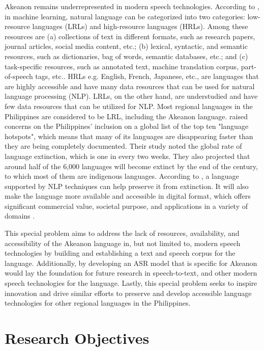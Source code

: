 Akeanon remains underrepresented in modern speech technologies. According to , in machine learning, natural language can be categorized into two categories: low-resource languages (LRLs) and high-resource languages (HRLs). Among these resources are (a) collections of text in different formats, such as research papers, journal articles, social media content, etc.; (b) lexical, syntactic, and semantic resources, such as dictionaries, bag of words, semantic databases, etc.; and (c) task-specific resources, such as annotated text, machine translation corpus, part-of-speech tags, etc.. HRLs e.g. English, French, Japanese, etc., are languages that are highly accessible and have many data resources that can be used for natural language processing (NLP). LRLs, on the other hand, are understudied and have few data resources that can be utilized for NLP.  Most regional languages in the Philippines are considered to be LRL, including the Akeanon language.  raised concerns on the Philippines' inclusion on a global list of the top ten "language hotspots", which means that many of its languages are disappearing faster than they are being completely documented. Their study noted the global rate of language extinction, which is one in every two weeks. They also projected that around half of the 6,000 languages will become extinct by the end of the century, to which most of them are indigenous languages. According to , a language supported by NLP techniques can help preserve it from extinction. It will also make the language more available and accessible in digital format, which offers significant commercial value, societal purpose, and applications in a variety of domains \cite{Tsvetkov:2017}.

This special problem aims to address the lack of resources, availability, and accessibility of the Akeanon language in, but not limited to, modern speech technologies by building and establishing a text and speech corpus for the language. Additionally, by developing an ASR model that is specific for Akeanon would lay the foundation for future research in speech-to-text, and other modern speech technologies for the language. Lastly, this special problem seeks to inspire innovation and drive similar efforts to preserve and develop accessible language technologies for other regional languages in the Philippines.

\section{Research Objectives}
\label{sec:researchobjectives}

